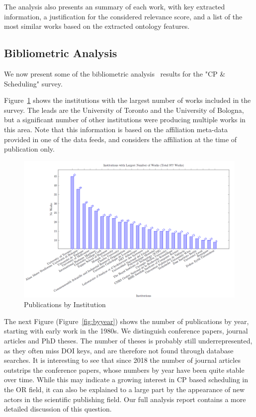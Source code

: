 \documentclass[
 hf]{ceurart}
\begin{document}
The analysis also presents an summary of each work, with key extracted information, a justification for the considered relevance score, and a list of the most similar works based on the extracted ontology features.

\subsection{Bibliometric Analysis}

We now present some of the bibliometric analysis~\cite{Donthu2021} results for the "CP \& Scheduling" survey.

Figure~\ref{fig:byinstitution} shows the institutions with the largest number of works included in the survey. The leads are the University of Toronto and the University of Bologna, but a significant number of other institutions were producing multiple works in this area. Note that this information is based on the affiliation meta-data provided in one of the data feeds, and considers the affiliation at the time of publication only. 

\begin{figure}[htbp]
\includegraphics[width=\textwidth]{images/byinstitution}
\caption{\label{fig:byinstitution}Publications by Institution}
\end{figure}

The next Figure (Figure~\ref{fig:byyear}) shows the number of publications by year, starting with early work in the 1980s. We distinguish conference papers, journal articles and PhD theses. The number of theses is probably still underrepresented, as they often miss DOI keys, and are therefore not found through database searches. It is interesting to see that since 2018 the number of journal articles outstrips the conference papers, whose numbers by year have been quite stable over time. While this may indicate a growing interest in CP based scheduling in the OR field, it can also be explained to a large part by the appearance of new actors in the scientific publishing field. Our full analysis report contains a more detailed discussion of this question.
\end{document}
